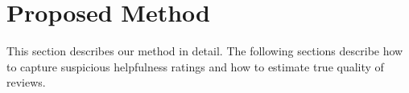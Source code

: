 \documentclass[master,english,final]{kaist-ucs}
\begin{document}
\chapter{Proposed Method}
This section describes our method in detail.
The following sections describe how to capture suspicious helpfulness ratings and how to estimate true quality of reviews.
\end{document}
